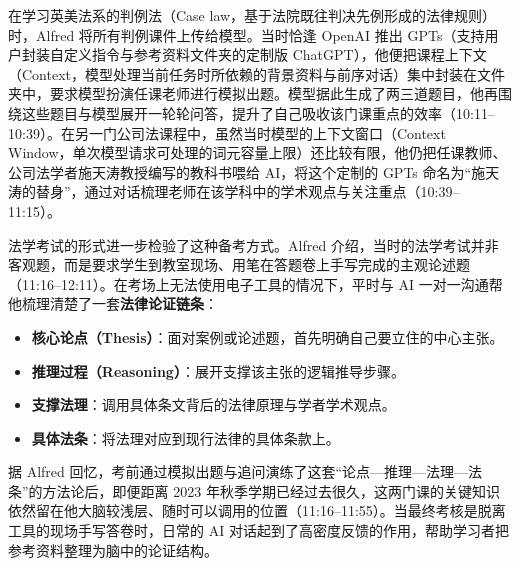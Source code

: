 \documentclass[UTF8,a4paper,11pt,fontset=fandol]{ctexart}
\begin{document}
在学习英美法系的判例法（Case law，基于法院既往判决先例形成的法律规则）时，Alfred 将所有判例课件上传给模型。当时恰逢 OpenAI 推出 GPTs（支持用户封装自定义指令与参考资料文件夹的定制版 ChatGPT），他便把课程上下文（Context，模型处理当前任务时所依赖的背景资料与前序对话）集中封装在文件夹中，要求模型扮演任课老师进行模拟出题。模型据此生成了两三道题目，他再围绕这些题目与模型展开一轮轮问答，提升了自己吸收该门课重点的效率（10:11–10:39）。在另一门公司法课程中，虽然当时模型的上下文窗口（Context Window，单次模型请求可处理的词元容量上限）还比较有限，他仍把任课教师、公司法学者施天涛教授编写的教科书喂给 AI，将这个定制的 GPTs 命名为“施天涛的替身”，通过对话梳理老师在该学科中的学术观点与关注重点（10:39–11:15）。

法学考试的形式进一步检验了这种备考方式。Alfred 介绍，当时的法学考试并非客观题，而是要求学生到教室现场、用笔在答题卷上手写完成的主观论述题（11:16–12:11）。在考场上无法使用电子工具的情况下，平时与 AI 一对一沟通帮他梳理清楚了一套\textbf{法律论证链条}：
\begin{itemize}
\item \textbf{核心论点（Thesis）}：面对案例或论述题，首先明确自己要立住的中心主张。
\item \textbf{推理过程（Reasoning）}：展开支撑该主张的逻辑推导步骤。
\item \textbf{支撑法理}：调用具体条文背后的法律原理与学者学术观点。
\item \textbf{具体法条}：将法理对应到现行法律的具体条款上。
\end{itemize}

据 Alfred 回忆，考前通过模拟出题与追问演练了这套“论点—推理—法理—法条”的方法论后，即便距离 2023 年秋季学期已经过去很久，这两门课的关键知识依然留在他大脑较浅层、随时可以调用的位置（11:16–11:55）。当最终考核是脱离工具的现场手写答卷时，日常的 AI 对话起到了高密度反馈的作用，帮助学习者把参考资料整理为脑中的论证结构。
\end{document}
